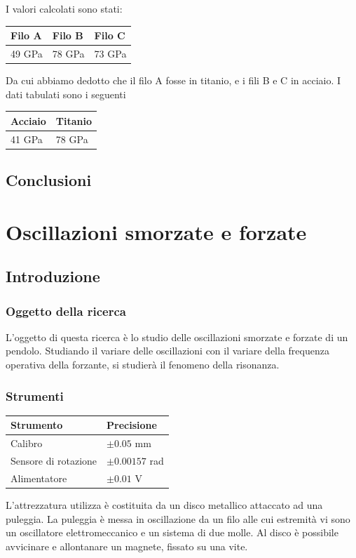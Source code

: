 \documentclass[a4paper,10pt]{report}
\begin{document}
I valori calcolati sono stati:
\begin{center}
\begin{tabular}{lll}
Filo A & Filo B & Filo C \\
\midrule
49 GPa & 78 GPa & 73 GPa \\
\end{tabular}
\end{center}

Da cui abbiamo dedotto che il filo A fosse in titanio, e i fili B e C in acciaio.
I dati tabulati sono i seguenti
\begin{center}
\begin{tabular}{ll}
Acciaio & Titanio \\
\midrule
41 GPa & 78 GPa \\
\end{tabular}
\end{center}

\section{Conclusioni}

\chapter{Oscillazioni smorzate e forzate}


\section{Introduzione}
\subsection{Oggetto della ricerca}
L'oggetto di questa ricerca è lo studio delle oscillazioni smorzate e forzate di un pendolo. Studiando il variare delle oscillazioni con il variare della frequenza operativa della forzante, si studierà il fenomeno della risonanza.

\subsection{Strumenti}
\begin{center}
\begin{tabular}{l|l}
\midrule
Strumento & Precisione\\
\midrule
Calibro & $\pm 0.05$ mm\\ 
Sensore di rotazione & $\pm 0.00157$ rad\\ 
Alimentatore & $\pm 0.01$ V\\ 
\midrule 
\end{tabular}
\end{center}
L'attrezzatura utilizza è costituita da un disco metallico attaccato ad una puleggia. La puleggia è messa in oscillazione da un filo alle cui estremità vi sono un oscillatore  elettromeccanico e un sistema di due molle. Al disco è possibile avvicinare e allontanare un magnete, fissato su una vite. 
\end{document}
